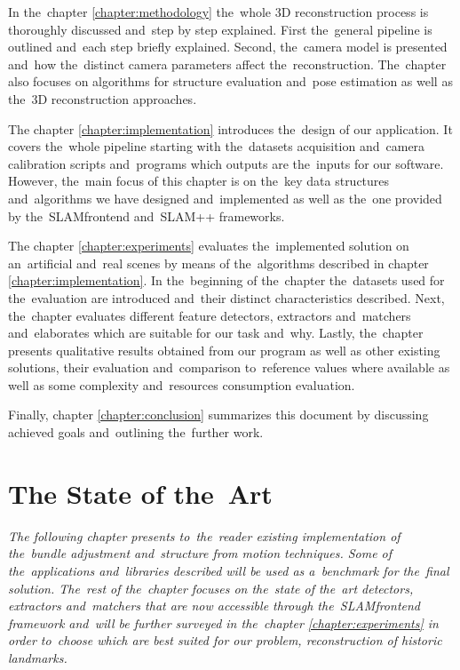In the~chapter \ref{chapter:methodology} the~whole 3D reconstruction process is thoroughly discussed and~step by step explained. First the~general pipeline is outlined and~each step briefly explained.  Second, the~camera model is presented and~how the~distinct camera parameters affect the~reconstruction. The~chapter also focuses on algorithms for structure evaluation and~pose estimation as well as the~3D reconstruction approaches.

The chapter \ref{chapter:implementation} introduces the~design of our application. It covers the~whole pipeline starting with the~datasets acquisition and~camera calibration scripts and~programs which outputs are the~inputs for our software. However, the~main focus of this chapter is on the~key data structures and~algorithms we have designed and~implemented as well as the~one provided by the~SLAM\textunderscore frontend and~SLAM++ frameworks.

The chapter \ref{chapter:experiments} evaluates the~implemented solution on an~artificial and~real scenes by means of the~algorithms described in chapter \ref{chapter:implementation}. In the~beginning of the~chapter the~datasets used for the~evaluation are introduced and~their distinct characteristics described. Next, the~chapter evaluates different feature detectors, extractors and~matchers and~elaborates which are suitable for our task and~why. Lastly, the~chapter presents qualitative results obtained from our program as well as other existing solutions, their evaluation and~comparison to~reference values where available as well as some complexity and~resources consumption evaluation.

Finally, chapter \ref{chapter:conclusion} summarizes this document by discussing achieved goals and~outlining the~further work.

\chapter{The State of the~Art}
\label{chapter:the-state-of-the-art}
\textit{The following chapter presents to~the~reader existing implementation of the~bundle adjustment and~structure from motion techniques. Some of the~applications and~libraries described will be used as a~benchmark for the~final solution. The~rest of the~chapter focuses on the~state of the~art detectors, extractors and~matchers that are now accessible through the~SLAM\textunderscore frontend framework and~will be further surveyed in the~chapter \ref{chapter:experiments} in order to~choose which are best suited for our problem, reconstruction of historic landmarks.}

